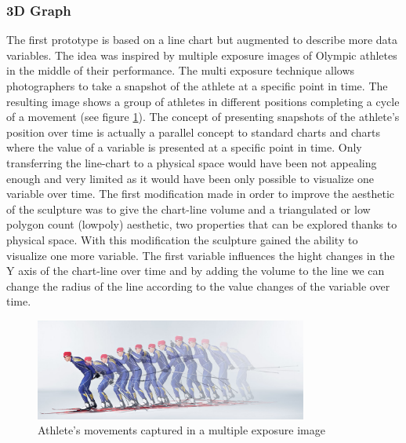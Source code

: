 \documentclass[../medieninformatik-arbeit.tex]{subfiles}
\begin{document}
\subsubsection{3D Graph}
The first prototype is based on a line chart but augmented to describe more data variables. The idea was inspired by multiple exposure images of Olympic athletes in the middle of their performance. The multi exposure technique allows photographers to take a snapshot of the athlete at a specific point in time. The resulting image shows a group of athletes in different positions completing a cycle of a movement (see figure \ref{fig:multiexposure}). The concept of presenting snapshots of the athlete's position over time is actually a parallel concept to standard charts and charts where the value of a variable is presented at a specific point in time. Only transferring the line-chart to a physical space would have been not appealing enough and very limited as it would have been only possible to visualize one variable over time. The first modification made in order to improve the aesthetic of the sculpture was to give the chart-line volume and a triangulated or low polygon count (lowpoly) aesthetic, two properties that can be explored thanks to physical space. With this modification the sculpture gained the ability to visualize one more variable. The first variable influences the hight changes in the Y axis of the chart-line over time and by adding the volume to the line we can change the radius of the line according to the value changes of the variable over time. 

\begin{figure}[ht]
\captionsetup{width=0.8\textwidth}
\begin{center}
  \includegraphics[width=0.8\textwidth]{Prototype/img/multiexposure}
  \caption{Athlete's movements captured in a multiple exposure image\cite{multiexposure}}
\label{fig:multiexposure}
\end{center}
\end{figure}
\end{document}
